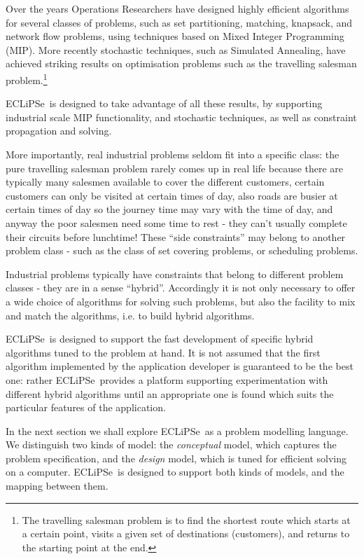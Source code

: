 \documentclass[a4wide]{article}
\newcommand{\ECL}{\mbox{ECLiPSe\ }{\hspace{1mm}}}
\begin{document}
Over the years Operations Researchers have designed highly efficient
algorithms for several classes of problems, such as set partitioning,
matching, knapsack, and network flow problems,
using techniques based on Mixed Integer Programming (MIP).
More recently stochastic techniques, such as Simulated Annealing,
have achieved striking results on optimisation problems such as the
travelling salesman problem.\footnote{The travelling salesman problem
is to find the shortest route which
starts at a certain point, visits a given set of destinations
(customers), and returns to the starting point at the end.}

\ECL is designed to take advantage of all these results, by supporting
industrial scale MIP functionality, and
stochastic techniques, as well as constraint propagation and solving.

More importantly, real industrial problems seldom fit into a specific
class: the pure travelling salesman problem rarely comes up in real
life because there are typically many salesmen available to cover the
different customers, certain customers can only be visited at certain times of
day, also roads are busier at certain times of day so the journey time
may vary with the time of day, and anyway the poor salesmen need  some
time to rest - they can't 
usually complete their circuits before lunchtime!
These ``side constraints'' may belong to another problem class - such
as the class of set covering problems, or scheduling problems.

Industrial problems typically have constraints that belong to different
problem classes - they are in a sense ``hybrid''.  
Accordingly it is
not only necessary to offer a wide choice of algorithms for solving such
problems, but also the facility to mix and match the
algorithms, i.e. to build hybrid algorithms.

\ECL is designed to support the fast development of specific hybrid
algorithms tuned to the problem at hand.  It is not assumed that the
first algorithm implemented by the application developer is guaranteed
to be the 
best one: rather \ECL provides a platform supporting experimentation
with different hybrid algorithms until an appropriate one is found
which suits the particular features of the application.

In the next section we shall explore
\ECL as a problem modelling language.  
We distinguish two kinds of model: the {\em conceptual} model, which
captures the problem specification, and the {\em design} model, which
is tuned for efficient solving on a computer.
\ECL is designed to support both kinds of models, and the mapping
between them.
\end{document}
